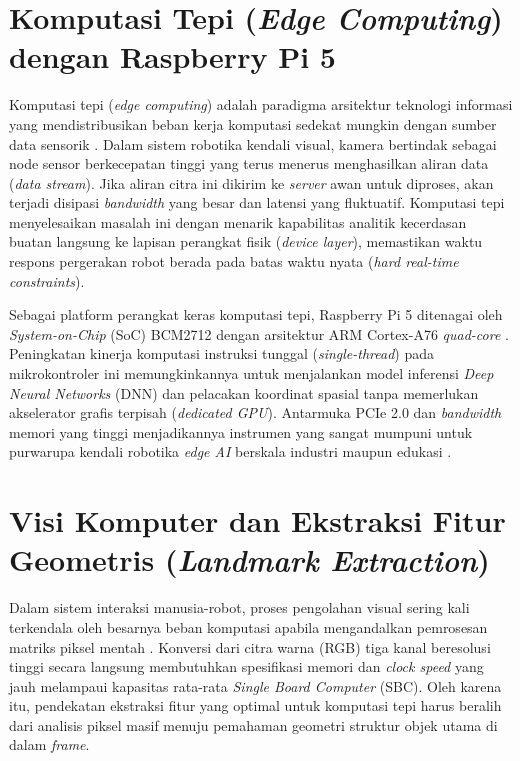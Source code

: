 \section{Komputasi Tepi (\textit{Edge Computing}) dengan Raspberry Pi 5}
Komputasi tepi (\textit{edge computing}) adalah paradigma arsitektur teknologi informasi yang mendistribusikan beban kerja komputasi sedekat mungkin dengan sumber data sensorik \cite{satyanarayanan2017}. Dalam sistem robotika kendali visual, kamera bertindak sebagai node sensor berkecepatan tinggi yang terus menerus menghasilkan aliran data (\textit{data stream}). Jika aliran citra ini dikirim ke \textit{server} awan untuk diproses, akan terjadi disipasi \textit{bandwidth} yang besar dan latensi yang fluktuatif. Komputasi tepi menyelesaikan masalah ini dengan menarik kapabilitas analitik kecerdasan buatan langsung ke lapisan perangkat fisik (\textit{device layer}), memastikan waktu respons pergerakan robot berada pada batas waktu nyata (\textit{hard real-time constraints}).

Sebagai platform perangkat keras komputasi tepi, Raspberry Pi 5 ditenagai oleh \textit{System-on-Chip} (SoC) BCM2712 dengan arsitektur ARM Cortex-A76 \textit{quad-core} \cite{rpi5brief2023}. Peningkatan kinerja komputasi instruksi tunggal (\textit{single-thread}) pada mikrokontroler ini memungkinkannya untuk menjalankan model inferensi \textit{Deep Neural Networks} (DNN) dan pelacakan koordinat spasial tanpa memerlukan akselerator grafis terpisah (\textit{dedicated GPU}). Antarmuka PCIe 2.0 dan \textit{bandwidth} memori yang tinggi menjadikannya instrumen yang sangat mumpuni untuk purwarupa kendali robotika \textit{edge AI} berskala industri maupun edukasi \cite{wang2020}.

\section{Visi Komputer dan Ekstraksi Fitur Geometris (\textit{Landmark Extraction})}
Dalam sistem interaksi manusia-robot, proses pengolahan visual sering kali terkendala oleh besarnya beban komputasi apabila mengandalkan pemrosesan matriks piksel mentah \cite{rautaray2015}. Konversi dari citra warna (RGB) tiga kanal beresolusi tinggi secara langsung membutuhkan spesifikasi memori dan \textit{clock speed} yang jauh melampaui kapasitas rata-rata \textit{Single Board Computer} (SBC). Oleh karena itu, pendekatan ekstraksi fitur yang optimal untuk komputasi tepi harus beralih dari analisis piksel masif menuju pemahaman geometri struktur objek utama di dalam \textit{frame}.

